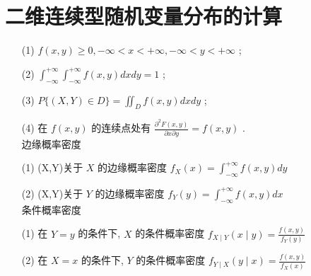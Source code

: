 \documentclass[12pt, a4paper, oneside, UTF8]{ctexbook}
\begin{document}
\section{二维连续型随机变量分布的计算}
\begin{remark}
\begin{enumerate} 主要内容 \\
联合概率密度的性质
    \item [(1)] $f\left( {x,y}\right)  \geq  0, - \infty  < x <  + \infty , - \infty  < y <  + \infty$ ;
    \item [(2)] ${\int }_{-\infty }^{+\infty }{\int }_{-\infty }^{+\infty }f\left( {x,y}\right) {dxdy} = 1$ ;
    \item [(3)] $P\{ \left( {X,Y}\right)  \in  D\}  = {\iint }_{D}f\left( {x,y}\right) {dxdy}$ ;
    \item [(4)]在 $f\left( {x,y}\right)$ 的连续点处有 $\frac{{\partial }^{2}F\left( {x,y}\right) }{\partial x\partial y} = f\left( {x,y}\right)$ .\\
边缘概率密度
    \item[(1)](X,Y)关于 $X$ 的边缘概率密度 ${f}_{X}\left( x\right)  = {\int }_{-\infty }^{+\infty }f\left( {x,y}\right) {dy}$
    \item[(2)](X,Y)关于 $Y$ 的边缘概率密度 ${f}_{Y}\left( y\right)  = {\int }_{-\infty }^{+\infty }f\left( {x,y}\right) {dx}$\\
条件概率密度
    \item[(1)]在 $Y = y$ 的条件下, $X$ 的条件概率密度 ${f}_{X \mid  Y}\left( {x \mid  y}\right)  = \frac{f\left( {x,y}\right) }{{f}_{Y}\left( y\right) }$
    \item[(2)]在 $X = x$ 的条件下, $Y$ 的条件概率密度 ${f}_{Y \mid  X}\left( {y \mid  x}\right)  = \frac{f\left( {x,y}\right) }{{f}_{X}\left( x\right) }$
\end{enumerate}
\end{remark}
\end{document}
